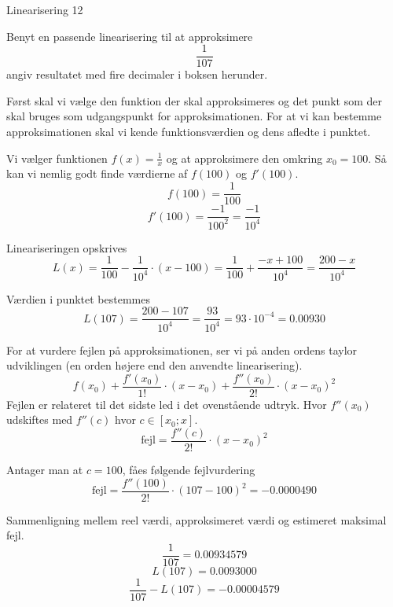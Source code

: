 \documentclass{article}
\begin{document}
\begin{exercise}{Linearisering 12}
	
	Benyt en passende linearisering til at approksimere
	\[
	\frac{1}{107}
	\]
	angiv resultatet med fire decimaler i boksen herunder.
	
	\hint
	Først skal vi vælge den funktion der skal approksimeres
	og det punkt som der skal bruges som udgangspunkt for 
	approksimationen.
	For at vi kan bestemme approksimationen skal vi 
	kende funktionsværdien og dens afledte i punktet.
	
	\hint
	Vi vælger funktionen $f(x) = \frac{1}{x}$ og at approksimere den 
	omkring $x_0 = 100$.
	Så kan vi nemlig godt finde værdierne af $f(100)$ og $f'(100)$.
	\[
	f(100) = \frac{1}{100} 
	\]
	\[
	f'(100) = \frac{-1}{100^2} = \frac{-1}{10^4}
	\]
	
	\hint
	Lineariseringen opskrives
	\[
	L(x) = \frac{1}{100} - \frac{1}{10^4} \cdot (x - 100) = \frac{1}{100} + \frac{-x+100}{10^4} = \frac{200 - x}{10^4}
	\]
	
	\hint
	Værdien i punktet bestemmes
	\[
	L(107) = \frac{200 - 107}{10^4} = \frac{93}{10^4} = 93 \cdot 10^{-4} = 0.00930
	\]

	
	\hint
	For at vurdere fejlen på approksimationen, ser vi på anden 
	ordens taylor udviklingen (en orden højere end den 
	anvendte linearisering).
	\[
	f(x_0) 
	+ \frac{f'(x_0)}{1!} \cdot (x - x_0) 
	+ \frac{f''(x_0)}{2!} \cdot (x - x_0)^2
	\]
	Fejlen er relateret til det sidste led i det ovenstående udtryk.
	Hvor $f''(x_0)$ udskiftes med $f''(c)$ hvor $c \in [x_0; x]$.
	\[
	\textrm{fejl} = \frac{f''(c)}{2!} \cdot (x - x_0)^2
	\]
	
	\hint 
	Antager man at $c = 100$, fåes følgende fejlvurdering
	\[
	\textrm{fejl} = \frac{f''(100)}{2!} \cdot (107 - 100)^2 = 
	-0.0000490\]
	
	\hint
	Sammenligning mellem reel værdi, approksimeret værdi og estimeret maksimal fejl.
	\[
	\frac{1}{107} = 0.00934579
	\]
	\[
	L(107) = 0.0093000
	\]
	\[
	\frac{1}{107} - L(107)  = -0.00004579
	\]
	
\end{exercise}
\end{document}
